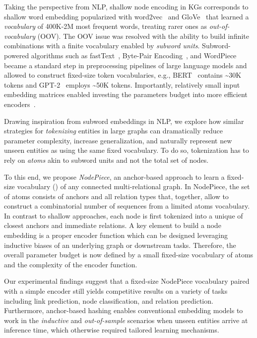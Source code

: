 \documentclass{article} \usepackage{iclr2022_conference,times}
\begin{document}
Taking the perspective from NLP, shallow node encoding in KGs corresponds to shallow word embedding popularized with word2vec~\citep{DBLP:conf/nips/MikolovSCCD13} and GloVe~\citep{DBLP:conf/emnlp/PenningtonSM14} that learned a \emph{vocabulary} of 400K-2M most frequent words, treating rarer ones as \emph{out-of-vocabulary} (OOV). 
The OOV issue was resolved with the ability to build infinite combinations with a finite vocabulary enabled by \emph{subword units}. 
Subword-powered algorithms such as fastText~\citep{bojanowski-etal-2017-enriching}, Byte-Pair Encoding~\citep{sennrich-etal-2016-neural}, and WordPiece~\citep{DBLP:conf/icassp/SchusterN12} became a standard step in preprocessing pipelines of large language models and allowed to construct fixed-size token vocabularies, e.g., BERT~\citep{DBLP:conf/naacl/DevlinCLT19}  contains \textasciitilde{}30K tokens and GPT-2~\citep{radford2019language} employs \textasciitilde{}50K tokens.
Importantly, relatively small input embedding matrices enabled investing the parameters budget into more efficient encoders~\citep{kaplan2020scaling}. 

Drawing inspiration from subword embeddings in NLP, we explore how similar strategies for \emph{tokenizing} entities in large graphs can dramatically reduce parameter complexity, increase generalization, and naturally represent new unseen entities as using the same fixed vocabulary. 
To do so, tokenization has to rely on \emph{atoms} akin to subword units and not the total set of nodes.

To this end, we propose \emph{NodePiece}, an anchor-based approach to learn a fixed-size vocabulary  () of any connected multi-relational graph.
In NodePiece, the set of atoms consists of anchors and all relation types that, together, allow to construct a combinatorial number of sequences from a limited atoms vocabulary.
In contrast to shallow approaches, each node  is first tokenized into a unique  of  closest anchors and  immediate relations.  
A key element to build a node embedding is a proper encoder function  which can be designed leveraging inductive biases of an underlying graph or downstream tasks. 
Therefore, the overall parameter budget is now defined by a small fixed-size vocabulary of atoms and the complexity of the encoder function.   

Our experimental findings suggest that a fixed-size NodePiece vocabulary
paired with a simple encoder still yields competitive results on a variety of tasks including link prediction, node classification, and relation prediction. 
Furthermore, anchor-based hashing enables conventional embedding models to work in the \emph{inductive} and \emph{out-of-sample} scenarios when unseen entities arrive at inference time, which otherwise required tailored learning mechanisms.
\end{document}
